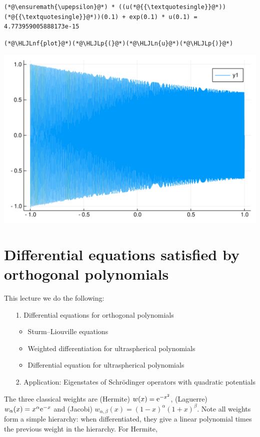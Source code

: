 \documentclass[12pt,a4paper]{article}
\newcommand{\HLJLn}[1]{#1}
\newcommand{\HLJLnf}[1]{\textcolor[RGB]{66,102,213}{#1}}
\newcommand{\HLJLp}[1]{#1}
\def\E{ {\rm e} }
\def\upepsilon{\varepsilon}
\def\endash{–}
\begin{document}
\begin{lstlisting}
(*@\ensuremath{\upepsilon}@*) * ((u(*@{{\textquotesingle}}@*))(*@{{\textquotesingle}}@*))(0.1) + exp(0.1) * u(0.1) = 4.773959005888173e-15
\end{lstlisting}


\begin{lstlisting}
(*@\HLJLnf{plot}@*)(*@\HLJLp{(}@*)(*@\HLJLn{u}@*)(*@\HLJLp{)}@*)
\end{lstlisting}

\includegraphics[width=\linewidth]{figures/Lecture22_20_1.pdf}

\section{Differential equations satisfied by orthogonal polynomials}
This lecture we do the following:

\begin{itemize}
\item[1. ] Differential equations for orthogonal polynomials

\begin{itemize}
\item Sturm\ensuremath{\endash}Liouville equations


\item Weighted differentiation for ultraspherical polynomials


\item Differential equation for ultraspherical polynomials

\end{itemize}

\item[2. ] Application: Eigenstates of Schrödinger operators with quadratic potentials

\end{itemize}
The three classical weights are (Hermite) $w(x) = \E^{-x^2}$, (Laguerre) $w_\alpha(x) = x^\alpha \E^{-x}$ and (Jacobi) $w_{\alpha,\beta}(x) = (1-x)^\alpha (1+x)^\beta$.   Note all weights form a simple hierarchy: when differentiated, they give a linear polynomial times the previous weight in the hierarchy.  For Hermite,
\end{document}
